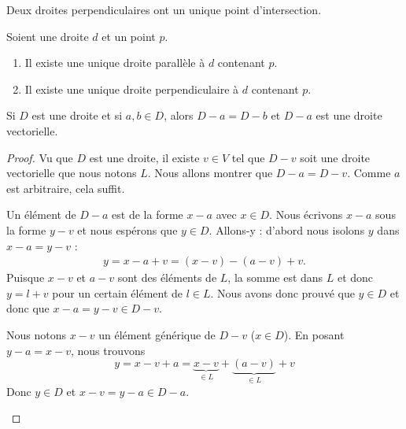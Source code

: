 \begin{lemma}       \label{LEMooRLFQooJADark}
	Deux droites perpendiculaires ont un unique point d'intersection.
\end{lemma}

\begin{proposition}     \label{PROPooPWNWooYuyrOc}
	Soient une droite \( d\) et un point \( p\).
	\begin{enumerate}
		\item
		      Il existe une unique droite parallèle à \( d\) contenant \( p\).
		\item
		      Il existe une unique droite perpendiculaire à \( d\) contenant \( p\).
	\end{enumerate}
\end{proposition}

\begin{lemma}       \label{LEMooQQFFooEZYeck}
	Si \( D\) est une droite et si \( a,b\in D\), alors \( D-a=D-b\) et \( D-a\) est une droite vectorielle.
\end{lemma}

\begin{proof}
	Vu que \( D\) est une droite, il existe \( v\in V\) tel que \( D-v\) soit une droite vectorielle que nous notons \( L\). Nous allons montrer que \( D-a=D-v\). Comme \( a\) est arbitraire, cela suffit.

	\begin{subproof}
		\spitem[\( D-a\subset D-v\)]
		Un élément de \( D-a\) est de la forme \( x-a\) avec \( x\in D\). Nous écrivons \( x-a\) sous la forme \( y-v\) et nous espérons que \( y\in D\). Allons-y : d'abord nous isolons \( y\) dans \( x-a=y-v\) :
		\begin{subequations}
			\begin{align}
				y=x-a+v=(x-v)-(a-v)+v.
			\end{align}
		\end{subequations}
		Puisque \( x-v\) et \( a-v\) sont des éléments de \( L\), la somme est dans \( L\) et donc \( y=l+v\) pour un certain élément de \( l\in L\). Nous avons donc prouvé que \( y\in D\) et donc que \( x-a=y-v\in D-v\).

		\spitem[\( D-v\subset D-a\)]
		Nous notons \( x-v\) un élément générique de \( D-v\) (\( x\in D\)). En posant \( y-a=x-v\), nous trouvons
		\begin{equation}
			y=x-v+a=\underbrace{x-v}_{\in L}+\underbrace{(a-v)}_{\in L}+v
		\end{equation}
		Donc \( y\in D\) et \( x-v=y-a\in D-a\).
	\end{subproof}
\end{proof}

